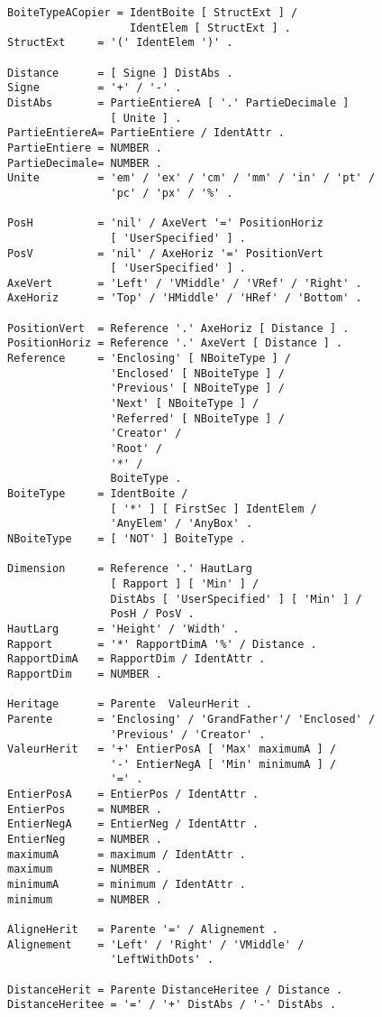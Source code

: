 {\begin{verbatim}
BoiteTypeACopier = IdentBoite [ StructExt ] /
                   IdentElem [ StructExt ] .
StructExt     = '(' IdentElem ')' .

Distance      = [ Signe ] DistAbs .
Signe         = '+' / '-' .
DistAbs       = PartieEntiereA [ '.' PartieDecimale ]
                [ Unite ] .
PartieEntiereA= PartieEntiere / IdentAttr .
PartieEntiere = NUMBER .
PartieDecimale= NUMBER .
Unite         = 'em' / 'ex' / 'cm' / 'mm' / 'in' / 'pt' /
                'pc' / 'px' / '%' .

PosH          = 'nil' / AxeVert '=' PositionHoriz 
                [ 'UserSpecified' ] .
PosV          = 'nil' / AxeHoriz '=' PositionVert 
                [ 'UserSpecified' ] .
AxeVert       = 'Left' / 'VMiddle' / 'VRef' / 'Right' .
AxeHoriz      = 'Top' / 'HMiddle' / 'HRef' / 'Bottom' .

PositionVert  = Reference '.' AxeHoriz [ Distance ] .
PositionHoriz = Reference '.' AxeVert [ Distance ] .
Reference     = 'Enclosing' [ NBoiteType ] /
                'Enclosed' [ NBoiteType ] /
                'Previous' [ NBoiteType ] /
                'Next' [ NBoiteType ] /
                'Referred' [ NBoiteType ] /
                'Creator' /
                'Root' /
                '*' /
                BoiteType .
BoiteType     = IdentBoite /
                [ '*' ] [ FirstSec ] IdentElem /
                'AnyElem' / 'AnyBox' .
NBoiteType    = [ 'NOT' ] BoiteType .

Dimension     = Reference '.' HautLarg
                [ Rapport ] [ 'Min' ] /
                DistAbs [ 'UserSpecified' ] [ 'Min' ] /
                PosH / PosV .
HautLarg      = 'Height' / 'Width' .
Rapport       = '*' RapportDimA '%' / Distance .
RapportDimA   = RapportDim / IdentAttr .
RapportDim    = NUMBER .

Heritage      = Parente  ValeurHerit .
Parente       = 'Enclosing' / 'GrandFather'/ 'Enclosed' /
                'Previous' / 'Creator' .
ValeurHerit   = '+' EntierPosA [ 'Max' maximumA ] /
                '-' EntierNegA [ 'Min' minimumA ] /
                '=' .
EntierPosA    = EntierPos / IdentAttr .
EntierPos     = NUMBER .
EntierNegA    = EntierNeg / IdentAttr .
EntierNeg     = NUMBER .
maximumA      = maximum / IdentAttr .
maximum       = NUMBER .
minimumA      = minimum / IdentAttr .
minimum       = NUMBER .

AligneHerit   = Parente '=' / Alignement .
Alignement    = 'Left' / 'Right' / 'VMiddle' /
                'LeftWithDots' .

DistanceHerit = Parente DistanceHeritee / Distance .
DistanceHeritee = '=' / '+' DistAbs / '-' DistAbs .


\end{verbatim}}
